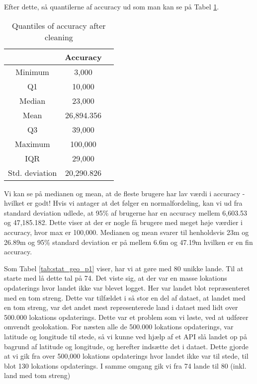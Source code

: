 Efter dette, så quantilerne af accuracy ud som man kan se på Tabel \ref{tab:acc_quantiles}. 
 \begin{table}[htbp]
        \centering
        \small
        \setlength\tabcolsep{2pt}
        \begin{tabular}{|c|c|c|}
            \hline
                         & Accuracy      \\[-3pt]
            \hline
                 Minimum &  3,000       \\
            \hline
                 Q1      &  10,000   \\
            \hline
                 Median  &  23,000    \\
            \hline
                 Mean    &  26,894.356    \\
            \hline
                 Q3      &  39,000      \\
            \hline
                 Maximum &  100,000   \\
            \hline
                 IQR     &   29,000     \\
            \hline
                Std. deviation  &  20,290.826   \\
            
        \end{tabular}
        \caption{Quantiles of accuracy after cleaning} %
        \label{tab:acc_quantiles}
\end{table}

Vi kan se på medianen og mean, at de fleste brugere har lav værdi i accuracy - hvilket er godt! Hvis vi antager at det følger en normalfordeling, kan vi ud fra standard deviation udlede, at 95\% af brugerne har en accuracy mellem 6,603.53 og 47,185.182. Dette viser at der er nogle få brugere med meget høje værdier i accuracy, hvor max er 100,000. Medianen og mean svarer til henholdsvis 23m og 26.89m og 95\% standard deviation er på mellem 6.6m og 47.19m hvilken er en fin accuracy. 

Som Tabel \ref{tab:stat_geo_p1} viser, har vi at gøre med 80 unikke lande. Til at starte med lå dette tal på 74. Det viste sig, at der var en masse lokations opdaterings hvor landet ikke var blevet logget. Her var landet blot repræsenteret med en tom streng. Dette var tilfældet i så stor en del af dataet, at landet med en tom streng, var det andet mest representerede land i dataet med lidt over 500.000 lokations opdaterings. 
Dette var et problem som vi løste, ved at udfører omvendt geolokation. For næsten alle de 500.000 lokations opdaterings, var latitude og longitude til stede, så vi kunne ved hjælp af et API\cite{reversegeocode} slå landet op på bagrund af latitude og longitude, og herefter indsætte det i dataet. 
Dette gjorde at vi gik fra over 500,000 lokations opdaterings hvor landet ikke var til stede, til blot 130 lokations opdaterings. I samme omgang gik vi fra 74 lande til 80 (inkl. land med tom streng)

